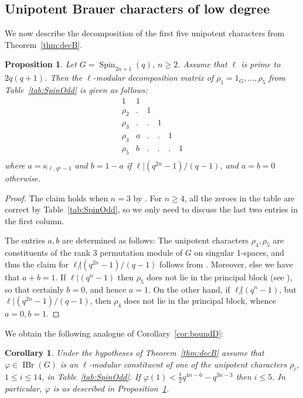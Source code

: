 \documentclass[12pt,leqno,a4paper]{amsart}
\newcommand{\IBr}{{\operatorname{IBr}}}
\newcommand{\Spin}{{\operatorname{Spin}}}
\newcommand{\hlf}{\frac{1}{2}}
\let\vhi=\varphi
\newtheorem{prop}[thm]{Proposition}
\newtheorem{cor}[thm]{Corollary}
\theoremstyle{remark}
\begin{document}
\subsection{Unipotent Brauer characters of low degree}

We now describe the decomposition of the first five unipotent characters
from Theorem~\ref{thm:decB}.

\begin{prop}   \label{prop:decmatBn}
 Let $G=\Spin_{2n+1}(q)$, $n\ge2$. Assume that  $\ell$ is prime to $2q(q+1)$.
 Then the $\ell$-modular decomposition matrix of $\rho_1=1_G,\ldots,\rho_5$
 from Table~\ref{tab:SpinOdd} is given as follows:
 \[\begin{array}{l|lllll}
       1& 1\\
  \rho_2& .& 1\\
  \rho_3& .& .& 1\\
  \rho_4& a& .& .& 1\\
  \rho_5& b& .& .& .& 1\\
 \end{array}\]
 where $a=\kappa_{\ell,q^n-1}$ and $b=1-a$ if $\ell|(q^{2n}-1)/(q-1)$, and
 $a=b=0$ otherwise.
\end{prop}

\begin{proof}
The claim holds when $n=3$ by \cite{HN14}. For $n\ge4$, all the zeroes in the
table are correct by Table~\ref{tab:SpinOdd}, so we only need to discuss the
last two entries in the first column. \par
The entries $a,b$ are determined as follows: The unipotent characters
$\rho_4,\rho_5$ are constituents of the rank 3 permutation module of $G$ on
singular 1-spaces, and thus the claim for $\ell{\not|}(q^{2n}-1)/(q-1)$
follows from \cite[Thm.~2.1]{Li86}. Moreover, else we have that $a+b=1$.
If $\ell|(q^n-1)$ then $\rho_5$ does not lie in the
principal block (see \cite[\S12]{FS}), so that certainly $b=0$, and hence $a=1$.
On the other hand, if $\ell{\not|}(q^n-1)$, but $\ell|(q^{2n}-1)/(q-1)$,
then $\rho_4$ does not lie in the principal block, whence $a=0,b=1$.
\end{proof}

We obtain the following analogue of Corollary~\ref{cor:boundD}:

\begin{cor}   \label{cor:boundB}
 Under the hypotheses of Theorem~\ref{thm:decB} assume that $\vhi\in\IBr(G)$
 is an $\ell$-modular constituent of one of the unipotent characters
 $\rho_i$, $1\le i\le 14$, in Table~\ref{tab:SpinOdd}.
 If $\vhi(1)<\hlf q^{4n-6}-q^{3n-3}$ then $i\le5$.
 In particular, $\vhi$ is as described in Proposition~\ref{prop:decmatBn}.
\end{cor}


\end{document}
